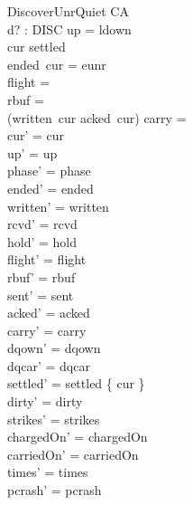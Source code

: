 \documentclass[a4paper,10pt,fleqn]{article}
\begin{document}
\begin{schema}{DiscoverUnrQuiet}
  \Delta CA \\
  d? : DISC
\where
  up = ldown \\
  cur \notin settled \\
  ended~cur = eunr \\
  flight = \emptyset \\
  rbuf = \emptyset \\
  (written~cur \setminus acked~cur) \cup carry = \emptyset \\
  cur' = cur \\
  up' = up \\
  phase' = phase \\
  ended' = ended \\
  written' = written \\
  rcvd' = rcvd \\
  hold' = hold \\
  flight' = flight \\
  rbuf' = rbuf \\
  sent' = sent \\
  acked' = acked \\
  carry' = carry \\
  dqown' = dqown \\
  dqcar' = dqcar \\
  settled' = settled \cup \{ cur \} \\
  dirty' = dirty \\
  strikes' = strikes \\
  chargedOn' = chargedOn \\
  carriedOn' = carriedOn \\
  times' = times \\
  pcrash' = pcrash
\end{schema}
\end{document}
